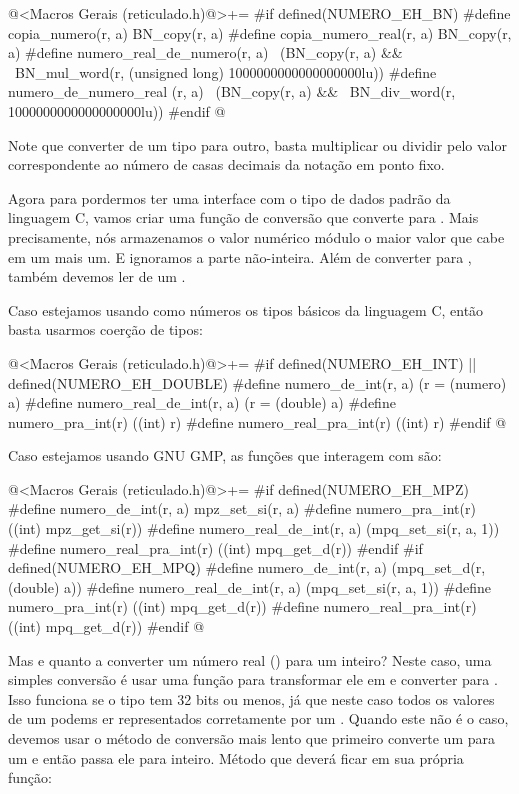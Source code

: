 \iniciocodigo
@<Macros Gerais (reticulado.h)@>+=
#if defined(NUMERO_EH_BN)
#define copia_numero(r, a) BN_copy(r, a)
#define copia_numero_real(r, a) BN_copy(r, a)
#define numero_real_de_numero(r, a) \
          (BN_copy(r, a) &&         \
          BN_mul_word(r, (unsigned long) 1000000000000000000lu))
#define numero_de_numero_real (r, a) \
          (BN_copy(r, a) &&          \
           BN_div_word(r, 1000000000000000000lu))
#endif
@
\fimcodigo

Note que converter de um tipo para outro, basta multiplicar ou dividir
pelo valor correspondente ao número de casas decimais da notação em
ponto fixo.

Agora para pordermos ter uma interface com o tipo de dados padrão da
linguagem C, vamos criar uma função de conversão que converte
para . Mais precisamente, nós armazenamos o valor
numérico módulo o maior valor que cabe em um  mais
um. E ignoramos a parte não-inteira. Além de converter
para , também devemos ler de um \monoespaco{int}.

Caso estejamos usando como números os tipos básicos da linguagem C,
então basta usarmos coerção de tipos:

\iniciocodigo
@<Macros Gerais (reticulado.h)@>+=
#if defined(NUMERO_EH_INT) || defined(NUMERO_EH_DOUBLE)
#define numero_de_int(r, a) (r = (numero) a)
#define numero_real_de_int(r, a) (r = (double) a)
#define numero_pra_int(r) ((int) r)
#define numero_real_pra_int(r) ((int) r)
#endif
@
\fimcodigo

Caso estejamos usando GNU GMP, as funções que interagem
com  são:

\iniciocodigo
@<Macros Gerais (reticulado.h)@>+=
#if defined(NUMERO_EH_MPZ)
#define numero_de_int(r, a) mpz_set_si(r, a)
#define numero_pra_int(r) ((int) mpz_get_si(r))
#define numero_real_de_int(r, a) (mpq_set_si(r, a, 1))
#define numero_real_pra_int(r) ((int) mpq_get_d(r))
#endif
#if defined(NUMERO_EH_MPQ)
#define numero_de_int(r, a) (mpq_set_d(r, (double) a))
#define numero_real_de_int(r, a) (mpq_set_si(r, a, 1))
#define numero_pra_int(r) ((int) mpq_get_d(r))
#define numero_real_pra_int(r) ((int) mpq_get_d(r))
#endif
@
\fimcodigo

Mas e quanto a converter um número real () para um
inteiro? Neste caso, uma simples conversão é usar uma função para
transformar ele em  e converter
para . Isso funciona se o tipo  tem 32
bits ou menos, já que neste caso todos os valores de
um \monoespaco{int} podems er representados corretamente por
um \monoespaco{double}. Quando este não é o caso, devemos usar o
método de conversão mais lento que primeiro converte
um \monoespaco{mpq\_t} para um \monoespaco{mpz\_t} e então passa ele
para inteiro. Método que deverá ficar em sua própria função:

